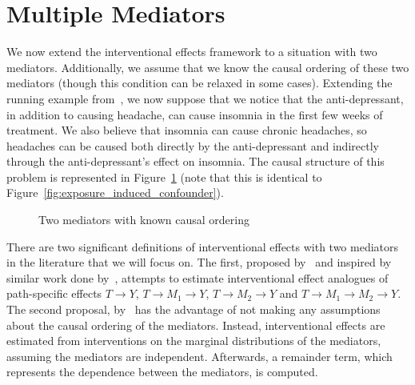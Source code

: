 \section{Multiple Mediators}

We now extend the interventional effects framework to a situation with two mediators. Additionally, we 
assume that we know the causal ordering of these two mediators (though this condition can be relaxed in 
some cases). Extending the running example from~\cite{morenobetancur2018}, we now suppose that we notice 
that the anti-depressant, in addition to causing headache, can cause insomnia in the first few weeks of
treatment. We also believe that insomnia can cause chronic headaches, so headaches can be caused both 
directly by the anti-depressant and indirectly through the anti-depressant's effect on insomnia. The 
causal structure of this problem is represented in Figure~\ref{fig:two_mediators} (note that this is 
identical to Figure~\ref{fig:exposure_induced_confounder}). 

\begin{figure}
\centering
{}
\caption{Two mediators with known causal ordering}
\label{fig:two_mediators}
\end{figure}


There are two significant definitions of interventional effects with
two mediators in the literature that we will focus on. The first, proposed by~\cite{linvanderweele2017} and
inspired by similar work done by~\cite{vanderweeletchetgentchetgen2017}, attempts to estimate 
interventional effect analogues of path-specific effects $T \rightarrow Y$, 
$T \rightarrow M_{1} \rightarrow Y$, $T \rightarrow M_{2} \rightarrow Y$ and 
$T \rightarrow M_{1} \rightarrow M_{2} \rightarrow Y$. The second proposal, by~\cite{vansteelandtdaniel2017}
has the advantage of not making any assumptions about the causal ordering of the mediators. Instead,
interventional effects are estimated from interventions on the marginal distributions of the mediators, 
assuming the mediators are independent. Afterwards, a remainder term, which represents the dependence between
the mediators, is computed. 

